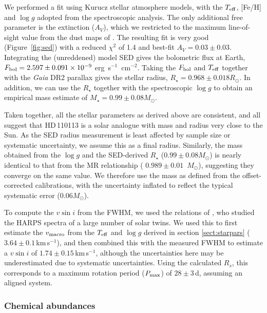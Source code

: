 \documentclass[fleqn,usenatbib]{mnras}
\newcommand{\harps}{{HARPS}}
\newcommand{\kms}{km\,s$^{-1}$}
\newcommand{\rstar}{\mbox{$R_{\star}$}}
\newcommand{\msun}{\mbox{$M_{\odot}$}}
\newcommand{\vsini}{$v\sin{i}$}
\newcommand{\teff}{$T_{\rm eff}$}
\newcommand{\feh}{\mbox{$\rm [Fe/H]$}}
\newcommand{\logg}{$\log g$}
\newcommand{\Tmstartorres}{ $ 0.989 \pm 0.01 $ }
\newcommand{\Tstar}{HD\,110113}
\begin{document}
We performed a fit using Kurucz stellar atmosphere models, with the $T_{\rm eff}$, [Fe/H] and $\log g$ adopted from the spectroscopic analysis. The only additional free parameter is the extinction ($A_V$), which we restricted to the maximum line-of-sight value from the dust maps of \citet{Schlegel:1998}. The resulting fit is very good (Figure~\ref{fig:sed}) with a reduced $\chi^2$ of 1.4 and best-fit $A_V = 0.03 \pm 0.03$. Integrating the (unreddened) model SED gives the bolometric flux at Earth, $F_{\rm bol} = 2.597 \pm 0.091 \times 10^{-9}$ erg~s$^{-1}$~cm$^{-2}$. Taking the $F_{\rm bol}$ and $T_{\rm eff}$ together with the {\it Gaia\/} DR2 parallax gives the stellar radius, $R_\star = 0.968 \pm 0.018 R_\odot$. In addition, we can use the $R_\star$ together with the spectroscopic $\log g$ to obtain an empirical mass estimate of $M_\star = 0.99 \pm 0.08 M_\odot$.

Taken together, all the stellar parameters as derived above are consistent, and all suggest that \Tstar{} is a solar analogue with mass and radius very close to the Sun.
As the SED radius measurement is least affected by sample size or systematic uncertainty, we assume this as a final radius.
Similarly, the mass obtained from the \logg{} and the SED-derived \rstar{} ($0.99 \pm 0.08 M_\odot$) is nearly identical to that from the MR relationship (\Tmstartorres{}\,\msun{}), suggesting they converge on the same value.
We therefore use the mass as defined from the offset-corrected \citet{2010A&ARv..18...67T} calibrations, with the uncertainty inflated to reflect the typical systematic error ($0.06M_{\odot}$).

To compute the \vsini{} from the FWHM, we used the relations of \citet{dos2016solar}, who studied the \harps{} spectra of a large number of solar twins.
We used this to first estimate the $v_{\rm macro}$ from the \teff{} and \logg{} derived in section \ref{sect:starpars} ($3.64\pm0.1$\,\kms{}), and then combined this with the measured FWHM to estimate a \vsini{} of $1.74\pm0.15$\,\kms{}, although the uncertainties here may be underestimated due to systematic uncertainties.
Using the calculated $R_s$, this corresponds to a maximum rotation period ($P_{\rm max}$) of $28\pm3$\,d, assuming an aligned system.

\subsubsection{Chemical abundances} \label{sect:abunds}
\end{document}
